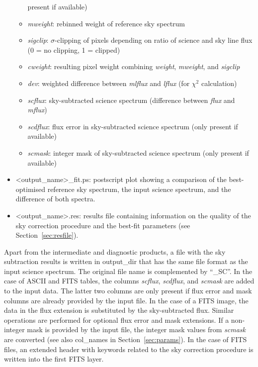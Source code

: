 \begin{itemize}
\begin{itemize}
        present if available)
  \item {\it mweight}: rebinned weight of reference sky spectrum
  \item {\it sigclip}: $\sigma$-clipping of pixels depending on ratio of
        science and sky line flux (0 = no clipping, 1 = clipped)
  \item {\it cweight}: resulting pixel weight combining {\it weight},
        {\it mweight}, and {\it sigclip}
  \item {\it dev}: weighted difference between {\it mlflux} and {\it lflux}
        (for $\chi^2$ calculation)
  \item {\it scflux}: sky-subtracted science spectrum (difference between
        {\it flux} and {\it mflux})
  \item {\it scdflux}: flux error in sky-subtracted science spectrum (only
        present if available)
  \item {\it scmask}: integer mask of sky-subtracted science spectrum (only
        present if available)
  \end{itemize}
\item <{\sc output\_name}>\_fit.ps: postscript plot showing a comparison of the
best-optimised reference sky spectrum, the input science spectrum, and the
difference of both spectra.
\item <{\sc output\_name}>.res: results file containing information on the
quality of the sky correction procedure and the best-fit parameters (see
Section~\ref{sec:resfile}).
\end{itemize}

Apart from the intermediate and diagnostic products, a file with the sky
subtraction results is written in {\sc output\_dir} that has the same file
format as the input science spectrum. The original file name is complemented by
``\_SC''. In the case of \ac{ASCII} and \ac{FITS} tables, the columns
{\it scflux}, {\it scdflux}, and {\it scmask} are added to the input data. The
latter two columns are only present if flux error and mask columns are already
provided by the input file. In the case of a \ac{FITS} image, the data in the
flux extension is substituted by the sky-subtracted flux. Similar operations
are performed for optional flux error and mask extensions. If a non-integer
mask is provided by the input file, the integer mask values from {\it scmask}
are converted (see also {\sc col\_names} in Section~\ref{sec:params}). In the
case of \ac{FITS} files, an extended header with keywords related to the sky
correction procedure is written into the first \ac{FITS} layer.

